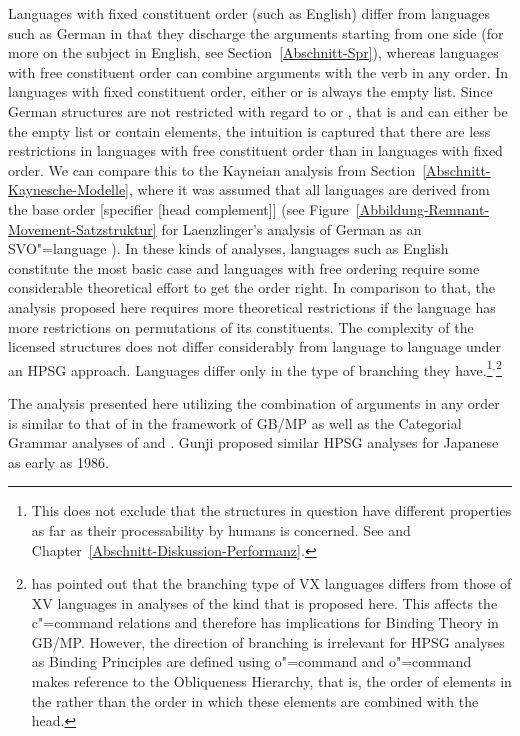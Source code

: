 Languages with fixed constituent order (such as English)
differ from languages such as German in that they discharge the arguments starting from one side (for more on the subject in
English, see Section~\ref{Abschnitt-Spr}), whereas languages with free constituent order can combine arguments with the verb
in any order. In languages with fixed constituent order, either  or  is always the empty list. Since German structures are
not restricted with regard to 
or , that is  and  can either be the empty list or contain elements, the
intuition is captured that there are less restrictions in languages with free constituent order than in languages with fixed order.
We can compare this to the Kayneian analysis from Section~\ref{Abschnitt-Kaynesche-Modelle}, where it was assumed
that all languages are derived from the base order [specifier [head complement]] (see
Figure~\vref{Abbildung-Remnant-Movement-Satzstruktur} for Laenzlinger's analysis of German as an
SVO"=language \citep{Laenzlinger2004a}). In these kinds of analyses, languages such as English constitute the most basic case and languages with
free ordering require some considerable theoretical effort to get the order right. In comparison to that, the analysis proposed here
requires more theoretical restrictions if the language has more restrictions on permutations of its constituents. The complexity of
the licensed structures does not differ considerably from language to language under an HPSG approach. Languages differ only in the type
of branching they have.\footnote{%
This does not exclude that the structures in question have different properties as far as their
processability by humans is concerned. See  and
  Chapter~\ref{Abschnitt-Diskussion-Performanz}.
}$^,$\footnote{%
\citet[]{Haider97c} has pointed out that the branching type of VX languages differs from
those of XV languages in analyses of the kind that is proposed here. This affects the c"=command
relations and therefore has implications for Binding Theory in GB/MP. However, the direction of branching is irrelevant for HPSG analyses as
Binding Principles are defined using o"=command \citep[Chapter~6]{ps2} and o"=command makes reference to the Obliqueness 
Hierarchy, that is, the order of elements in the \compsl rather than the order in which these elements are combined with the head.
}

The analysis presented here utilizing the combination of arguments in any order is similar to that of \citet{Fanselow2001a} in the framework
of GB/MP as well as the Categorial Grammar analyses of \citet[Section~3.1]{Hoffmann95a-u} and \citet{SB2006a-u}.
Gunji\nocite{Gunji86a} proposed similar HPSG analyses for Japanese as early as 1986.

